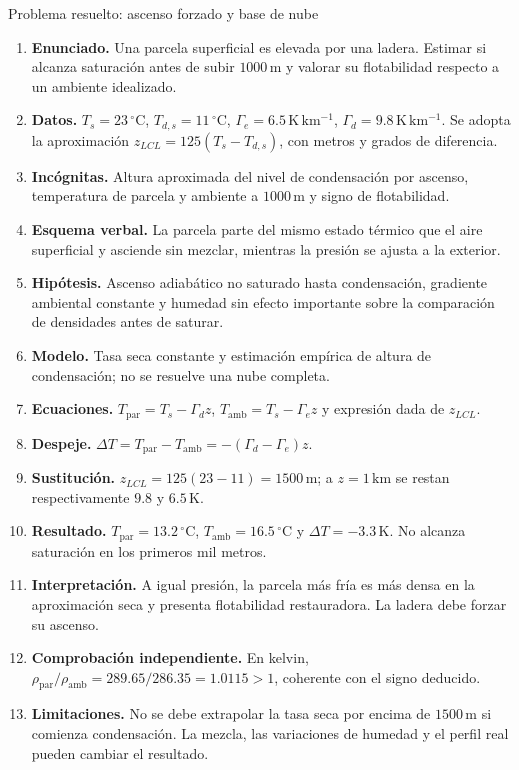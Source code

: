 \begin{studiumworked}{Problema resuelto: ascenso forzado y base de nube}

\begin{enumerate}
\item \textbf{Enunciado.} Una parcela superficial es elevada por una ladera. Estimar si alcanza saturación antes de subir $1000\,\mathrm{m}$ y valorar su flotabilidad respecto a un ambiente idealizado.
\item \textbf{Datos.} $T_s=23\,{}^\circ\mathrm{C}$, $T_{d,s}=11\,{}^\circ\mathrm{C}$, $\Gamma_e=6.5\,\mathrm{K\,km^{-1}}$, $\Gamma_d=9.8\,\mathrm{K\,km^{-1}}$. Se adopta la aproximación $z_{LCL}=125(T_s-T_{d,s})$, con metros y grados de diferencia.
\item \textbf{Incógnitas.} Altura aproximada del nivel de condensación por ascenso, temperatura de parcela y ambiente a $1000\,\mathrm{m}$ y signo de flotabilidad.
\item \textbf{Esquema verbal.} La parcela parte del mismo estado térmico que el aire superficial y asciende sin mezclar, mientras la presión se ajusta a la exterior.
\item \textbf{Hipótesis.} Ascenso adiabático no saturado hasta condensación, gradiente ambiental constante y humedad sin efecto importante sobre la comparación de densidades antes de saturar.
\item \textbf{Modelo.} Tasa seca constante y estimación empírica de altura de condensación; no se resuelve una nube completa.
\item \textbf{Ecuaciones.} $T_{\mathrm{par}}=T_s-\Gamma_d z$, $T_{\mathrm{amb}}=T_s-\Gamma_e z$ y expresión dada de $z_{LCL}$.
\item \textbf{Despeje.} $\Delta T=T_{\mathrm{par}}-T_{\mathrm{amb}}=-(\Gamma_d-\Gamma_e)z$.
\item \textbf{Sustitución.} $z_{LCL}=125(23-11)=1500\,\mathrm{m}$; a $z=1\,\mathrm{km}$ se restan respectivamente $9.8$ y $6.5\,\mathrm{K}$.
\item \textbf{Resultado.} $T_{\mathrm{par}}=13.2\,{}^\circ\mathrm{C}$, $T_{\mathrm{amb}}=16.5\,{}^\circ\mathrm{C}$ y $\Delta T=-3.3\,\mathrm{K}$. No alcanza saturación en los primeros mil metros.
\item \textbf{Interpretación.} A igual presión, la parcela más fría es más densa en la aproximación seca y presenta flotabilidad restauradora. La ladera debe forzar su ascenso.
\item \textbf{Comprobación independiente.} En kelvin, $\rho_{\mathrm{par}}/\rho_{\mathrm{amb}}=289.65/286.35=1.0115>1$, coherente con el signo deducido.
\item \textbf{Limitaciones.} No se debe extrapolar la tasa seca por encima de $1500\,\mathrm{m}$ si comienza condensación. La mezcla, las variaciones de humedad y el perfil real pueden cambiar el resultado.
\end{enumerate}


\end{studiumworked}

